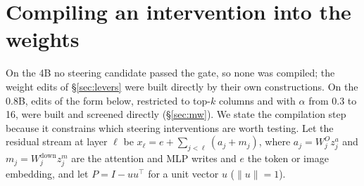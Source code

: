 \section{Compiling an intervention into the weights}
\label{sec:compile}
On the 4B no steering candidate passed the gate, so none was compiled; the weight edits of \S\ref{sec:levers} were built directly by their own constructions. On the 0.8B, edits of the form below, restricted to top-$k$ columns and with $\alpha$ from 0.3 to 16, were built and screened directly (\S\ref{sec:mw}). We state the compilation step because it constrains which steering interventions are worth testing. Let the residual stream at layer $\ell$ be $x_\ell = e + \sum_{j<\ell}(a_j + m_j)$, where $a_j=W^O_j z^a_j$ and $m_j=W^{\text{down}}_j z^m_j$ are the attention and MLP writes and $e$ the token or image embedding, and let $P=I-uu^\top$ for a unit vector $u$ ($\|u\|=1$).

